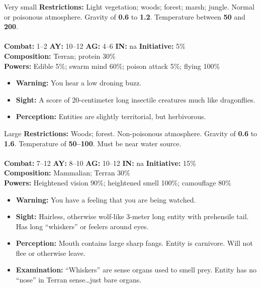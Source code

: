 \hrulefill

  \begin{creature}{Very small}
    \textbf{Restrictions:} Light vegetation; woods; forest; marsh; jungle. Normal or poisonous atmosphere. Gravity of \textbf{0.6} to \textbf{1.2}. Temperature 
    between \textbf{50\textdegree} and \textbf{200\textdegree}. \\\\
    \textbf{Combat:} 1--2 \textbf{AY:} 10--12 \textbf{AG:} 4--6 \textbf{IN:} na \textbf{Initiative:} 5\% \\
    \textbf{Composition:} Terran; protein 30\% \\
    \textbf{Powers:} Edible 5\%; swarm mind 60\%; poison attack 5\%; flying 100\% 
    \begin{itemize}
    \item\textbf{Warning:} You hear a low droning buzz. 
    \item\textbf{Sight:} A score of 20-centimeter long insectile creatures much like dragonflies. 
    \item\textbf{Perception:} Entities are slightly territorial, but herbivorous. 
    \end{itemize}
  \end{creature}

\hrulefill

  \begin{creature}{Large}
    \textbf{Restrictions:} Woods; forest. Non-poisonous atmosphere. Gravity of \textbf{0.6} to \textbf{1.6}. Temperature of \textbf{50\textdegree--100\textdegree}. Must be near water 
    source. \\\\
    \textbf{Combat:} 7--12 \textbf{AY:} 8--10 \textbf{AG:} 10--12 \textbf{IN:} na \textbf{Initiative:} 15\% \\
    \textbf{Composition:} Mammalian; Terran 30\% \\
    \textbf{Powers:} Heightened vision 90\%; heightened smell 100\%; camouflage 80\% 
    \begin{itemize}
    \item\textbf{Warning:} You have a feeling that you are being watched. 
    \item\textbf{Sight:} Hairless, otherwise wolf-like 3-meter long entity with prehensile tail. Has long ``whiskers'' or feelers around eyes. 
    \item\textbf{Perception:} Mouth contains large sharp fangs. Entity is carnivore. Will not flee or otherwise leave. 
    \item\textbf{Examination:} ``Whiskers'' are sense organs used to smell
      prey. Entity has no ``nose'' in Terran sense\ldots just bare organs. 
    \end{itemize}
  \end{creature}

